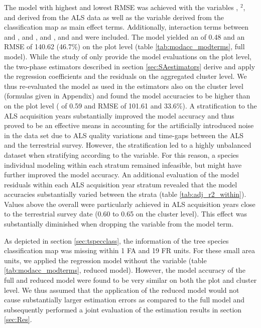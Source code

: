 The model with highest \adjrsq{} and lowest RMSE was achieved with the variables \meanheight{}, \meanheight{}$^2$, \stddev{} and \alsyear{} derived from the ALS data as well as the \treespecies{} variable derived from the classification map as main effect terms. Additionally, interaction terms between \meanheight{} and \alsyear{}, \stddev{} and \alsyear{}, \meanheight{} and \stddev{}, and \meanheight{} and \treespecies{} were included. The model yielded an \adjrsq{} of 0.48 and an RMSE of 140.62 \mha{} (46.7\%) on the plot level (table \ref{tab:modacc_modterms}, full model). While the study of \citet{hill2017a} only provide the model evaluations on the plot level, the two-phase estimators described in section \ref{sec:SAestimators} derive and apply the regression coefficients and the residuals on the aggregated cluster level. We thus re-evaluated the model as used in the estimators also on the cluster level (formulas given in Appendix) and found the model accuracies to be higher than on the plot level (\adjrsq{} of 0.59 and RMSE of 101.61 \mha{} and 33.6\%). A stratification to the ALS acquisition years substantially improved the model accuracy and thus proved to be an effective means in accounting for the artificially introduced noise in the data set due to ALS quality variations and time-gaps between the ALS and the terrestrial survey. However, the stratification led to a highly unbalanced dataset when stratifying according to the \treespecies{} variable. For this reason, a species individual modeling within each \alsyear{} stratum remained infeasible, but might have further improved the model accuracy. An additional evaluation of the model residuals within each ALS acquisition year stratum revealed that the model accuracies substantially varied between the strata (table \ref{tab:adj_r2_within}). Values above the overall \adjrsq{} were particularly achieved in ALS acquisition years close to the terrestrial survey date (0.60 to 0.65 on the cluster level). This effect was substantially diminished when dropping the \alsyear{} variable from the model term.\par

As depicted in section \ref{sec:tspecclass}, the information of the tree species classification map was missing within 1 FA and 19 FR units. For these small area units, we applied the regression model without the \treespecies{} variable (table \ref{tab:modacc_modterms}, reduced model). However, the model accuracy of the full and reduced model were found to be very similar on both the plot and cluster level. We thus assumed that the application of the reduced model would not cause substantially larger estimation errors as compared to the full model and subsequently performed a joint evaluation of the estimation results in section \ref{sec:Res}.

